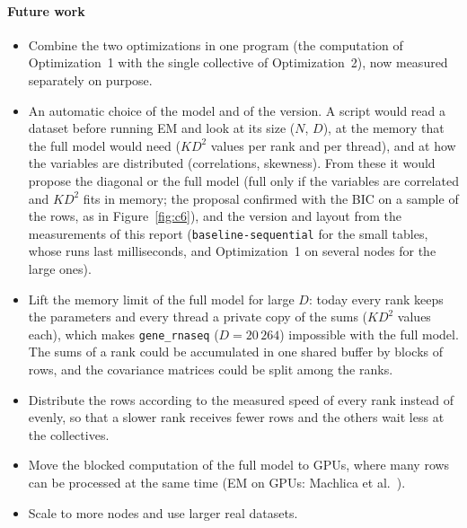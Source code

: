 \documentclass[conference,onecolumn]{IEEEtran}
\newcommand{\vseq}{\texttt{baseline-\allowbreak sequential}}
\begin{document}
\paragraph{Future work}
\begin{itemize}
\item Combine the two optimizations in one program (the computation of Optimization~1 with the single collective of Optimization~2), now measured separately on purpose.
\item An automatic choice of the model and of the version. A script would read a dataset before running EM and look at its size ($N$, $D$), at the memory that the full model would need ($K D^2$ values per rank and per thread), and at how the variables are distributed (correlations, skewness). From these it would propose the diagonal or the full model (full only if the variables are correlated and $KD^2$ fits in memory; the proposal confirmed with the BIC on a sample of the rows, as in Figure~\ref{fig:c6}), and the version and layout from the measurements of this report (\vseq{} for the small tables, whose runs last milliseconds, and Optimization~1 on several nodes for the large ones).
\item Lift the memory limit of the full model for large $D$: today every rank keeps the parameters and every thread a private copy of the sums ($KD^2$ values each), which makes \texttt{gene\_rnaseq} ($D=20\,264$) impossible with the full model. The sums of a rank could be accumulated in one shared buffer by blocks of rows, and the covariance matrices could be split among the ranks.
\item Distribute the rows according to the measured speed of every rank instead of evenly, so that a slower rank receives fewer rows and the others wait less at the collectives.
\item Move the blocked computation of the full model to GPUs, where many rows can be processed at the same time (EM on GPUs: Machlica et al.~\cite{machlica}).
\item Scale to more nodes and use larger real datasets.
\end{itemize}
\end{document}
